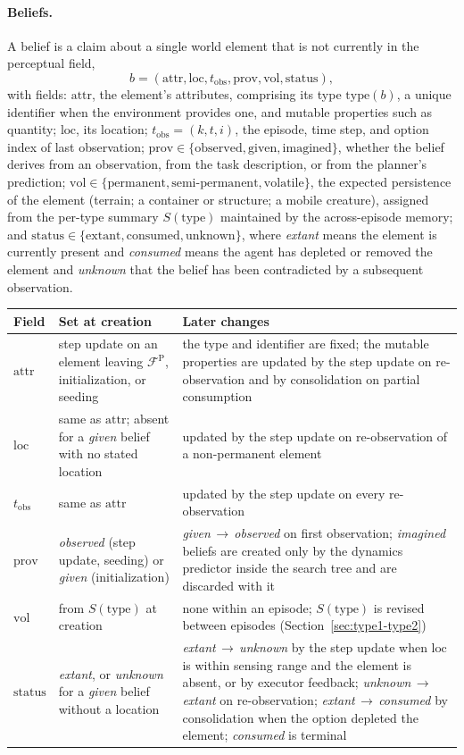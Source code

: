 \documentclass[11pt]{article}
\makeatletter
\newcommand{\calF}{\mathcal{F}}
\newcommand{\FP}{\calF^{\mathrm{P}}}
\newcommand{\loc}{\mathrm{loc}}
\newcommand{\prov}{\mathrm{prov}}
\newcommand{\vol}{\mathrm{vol}}
\newcommand{\stat}{\mathrm{status}}
\newcommand{\attr}{\mathrm{attr}}
\newcommand{\type}{\mathrm{type}}
\newcommand{\tobs}{t_{\mathrm{obs}}}
\newenvironment{lifecycle}{\begin{center}\small\begin{tabular}{@{}>{\raggedright\arraybackslash}p{0.17\textwidth}>{\raggedright\arraybackslash}p{0.36\textwidth}>{\raggedright\arraybackslash}p{0.40\textwidth}@{}}\toprule Field & Set at creation & Later changes \\ \midrule}{\bottomrule\end{tabular}\end{center}}
\makeatother
\begin{document}
\paragraph{Beliefs.}
A belief is a claim about a single world element that is not currently in the perceptual field,
\begin{equation}
b=(\attr,\loc,\tobs,\prov,\vol,\stat),
\label{eq:belief}
\end{equation}
with fields: $\attr$, the element's attributes, comprising its type $\type(b)$, a unique identifier when the environment provides one, and mutable properties such as quantity; $\loc$, its location; $\tobs=(k,t,i)$, the episode, time step, and option index of last observation; $\prov\in\{\mathrm{observed},\mathrm{given},\mathrm{imagined}\}$, whether the belief derives from an observation, from the task description, or from the planner's prediction; $\vol\in\{\mathrm{permanent},\mathrm{semi\text{-}permanent},\mathrm{volatile}\}$, the expected persistence of the element (terrain; a container or structure; a mobile creature), assigned from the per-type summary $S(\type)$ maintained by the across-episode memory; and $\stat\in\{\mathrm{extant},\mathrm{consumed},\mathrm{unknown}\}$, 
where \emph{extant} means the element is currently present and \emph{consumed} means the agent has depleted or removed the element and \emph{unknown} that the belief has been contradicted by a subsequent observation. 

\begin{lifecycle}
$\attr$ & step update on an element leaving $\FP$, initialization, or seeding & the type and identifier are fixed; the mutable properties are updated by the step update on re-observation and by consolidation on partial consumption \\
$\loc$ & same as $\attr$; absent for a \emph{given} belief with no stated location & updated by the step update on re-observation of a non-permanent element \\
$\tobs$ & same as $\attr$ & updated by the step update on every re-observation \\
$\prov$ & \emph{observed} (step update, seeding) or \emph{given} (initialization) & \emph{given}\,$\to$\,\emph{observed} on first observation; \emph{imagined} beliefs are created only by the dynamics predictor inside the search tree and are discarded with it \\
$\vol$ & from $S(\type)$ at creation & none within an episode; $S(\type)$ is revised between episodes (Section~\ref{sec:type1-type2}) \\
$\stat$ & \emph{extant}, or \emph{unknown} for a \emph{given} belief without a location & \emph{extant}\,$\to$\,\emph{unknown} by the step update when $\loc$ is within sensing range and the element is absent, or by executor feedback; \emph{unknown}\,$\to$\,\emph{extant} on re-observation; \emph{extant}\,$\to$\,\emph{consumed} by consolidation when the option depleted the element; \emph{consumed} is terminal \\
\end{lifecycle}
\end{document}
